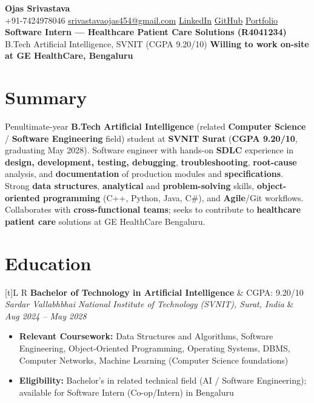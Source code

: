 \documentclass[a4paper,10pt]{article}
\newcommand{\resumeSubheading}[4]{%
  \vspace{0.5mm}
  \noindent
  \begin{tabularx}{\textwidth}[t]{L R}
    \textbf{#1} & #4 \\
    \textit{#3} & \textit{#2} \\
  \end{tabularx}
  \vspace{-0.5mm}%
}
\begin{document}
\selectfont

\begin{center}
  {\LARGE \textbf{Ojas Srivastava}} \\[1mm]
  \small
  +91-7424978046 \textbar{}
  \href{mailto:srivastavaojas454@gmail.com}{srivastavaojas454@gmail.com} \textbar{}
  \href{https://linkedin.com/in/ojas-srivastava05}{LinkedIn} \textbar{}
  \href{https://github.com/Ojas-Srivastava05}{GitHub} \textbar{}
  \href{https://ojas-srivastava.vercel.app}{Portfolio} \\[0.5mm]
  \textbf{Software Intern --- Healthcare Patient Care Solutions (R4041234)} \textbar{}
  B.Tech Artificial Intelligence, SVNIT (CGPA 9.20/10) \textbar{}
  \textbf{Willing to work on-site at GE HealthCare, Bengaluru}
\end{center}

\vspace{-1mm}

\section{Summary}
\small
Penultimate-year \textbf{B.Tech Artificial Intelligence} (related \textbf{Computer Science} / \textbf{Software Engineering} field) student at \textbf{SVNIT Surat} (\textbf{CGPA 9.20/10}, graduating May 2028). Software engineer with hands-on \textbf{SDLC} experience in \textbf{design, development, testing, debugging}, \textbf{troubleshooting}, \textbf{root-cause} analysis, and \textbf{documentation} of production modules and \textbf{specifications}. Strong \textbf{data structures}, \textbf{analytical} and \textbf{problem-solving} skills, \textbf{object-oriented programming} (C++, Python, Java, C\#), and \textbf{Agile}/Git workflows. Collaborates with \textbf{cross-functional teams}; seeks to contribute to \textbf{healthcare patient care} solutions at GE HealthCare Bengaluru.

\section{Education}
\small
\resumeSubheading
  {Bachelor of Technology in Artificial Intelligence}{Aug 2024 -- May 2028}
  {Sardar Vallabhbhai National Institute of Technology (SVNIT), Surat, India}{CGPA: 9.20/10}
\begin{itemize}
  \item \textbf{Relevant Coursework:} Data Structures and Algorithms, Software Engineering, Object-Oriented Programming, Operating Systems, DBMS, Computer Networks, Machine Learning (Computer Science foundations)
  \item \textbf{Eligibility:} Bachelor's in related technical field (AI / Software Engineering); available for Software Intern (Co-op/Intern) in Bengaluru
\end{itemize}
\end{document}
